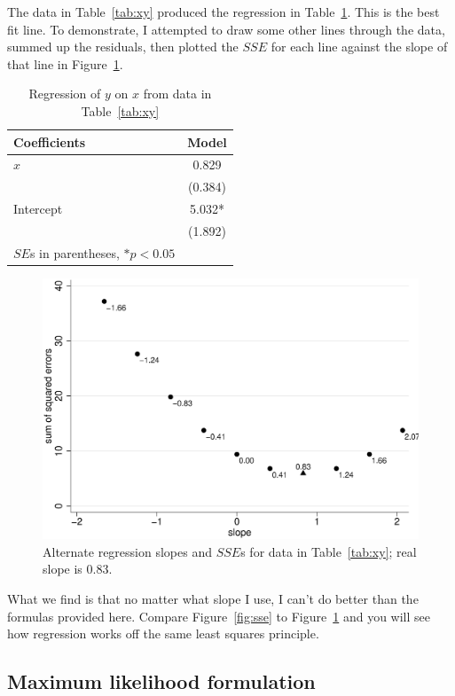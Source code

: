 The data in Table~\ref{tab:xy} produced the regression in Table~\ref{tab:xyreg}. This is the best fit line. To demonstrate, I attempted to draw some other lines through the data, summed up the residuals, then plotted the $SSE$ for each line against the slope of that line in Figure~\ref{fig:altsse}.

\begin{table}[htbp]\centering
 \caption{Regression of $y$ on $x$ from data in Table~\ref{tab:xy}
\label{tab:xyreg}}
\begin{tabular}{lc}
Coefficients      &    Model  \\
\hline
$x$      &    0.829  \\
      &   (0.384)  \\
Intercept    &    5.032* \\
      &   (1.892)  \\
\hline
\multicolumn{1}{l}{$SE$s in parentheses, $*p<0.05$} \\
\hline
\end{tabular}
\end{table}

\begin{figure}
   \centering
   \includegraphics[angle=0,
           width=.75\textwidth]{altsse.eps}
   \caption{Alternate regression slopes and $SSE$s for data in Table~\ref{tab:xy}; real slope is 0.83.}
  \label{fig:altsse}
\end{figure}
What we find is that no matter what slope I use, I can't do better than the formulas provided here. Compare Figure~\ref{fig:sse} to Figure~\ref{fig:altsse} and you will see how regression works off the same least squares principle.

\subsection{Maximum likelihood formulation}

